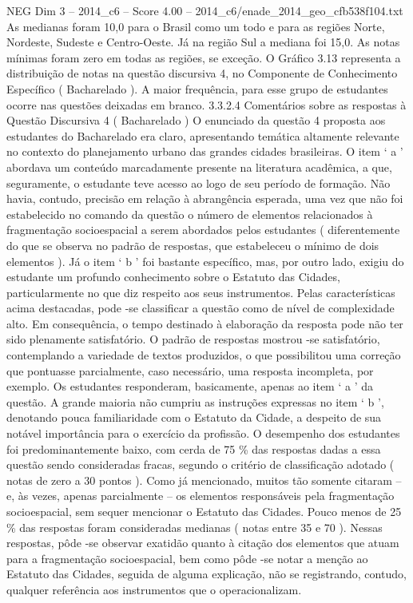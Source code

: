 \begin{textsample}{NEG Dim 3 – 2014\_c6 – Score 4.00 – 2014\_c6/enade\_2014\_geo\_cfb538f104.txt}
As medianas foram 10,0 para o Brasil como um todo e para as regiões Norte, Nordeste, Sudeste e Centro-Oeste.
Já na região Sul a mediana foi 15,0.
As notas mínimas foram zero em todas as regiões, se exceção.
O Gráfico 3.13 representa a distribuição de notas na questão discursiva 4, no Componente de Conhecimento Específico ( Bacharelado ).
A maior frequência, para esse grupo de estudantes ocorre nas questões deixadas em branco. 3.3.2.4 Comentários sobre as respostas à Questão Discursiva 4 ( Bacharelado ) O enunciado da questão 4 proposta aos estudantes do Bacharelado era claro, apresentando temática altamente relevante no contexto do planejamento urbano das grandes cidades brasileiras.
O item ‘ a ’ abordava um conteúdo marcadamente presente na literatura acadêmica, a que, seguramente, o estudante teve acesso ao logo de seu período de formação.
Não havia, contudo, precisão em relação à abrangência esperada, uma vez que não foi estabelecido no comando da questão o número de elementos relacionados à fragmentação socioespacial a serem abordados pelos estudantes ( diferentemente do que se observa no padrão de respostas, que estabeleceu o mínimo de dois elementos ).
Já o item ‘ b ’ foi bastante específico, mas, por outro lado, exigiu do estudante um profundo conhecimento sobre o Estatuto das Cidades, particularmente no que diz respeito aos seus instrumentos.
Pelas características acima destacadas, pode -se classificar a questão como de nível de complexidade alto.
Em consequência, o tempo destinado à elaboração da resposta pode não ter sido plenamente satisfatório.
O padrão de respostas mostrou -se satisfatório, contemplando a variedade de textos produzidos, o que possibilitou uma correção que pontuasse parcialmente, caso necessário, uma resposta incompleta, por exemplo.
Os estudantes responderam, basicamente, apenas ao item ‘ a ’ da questão.
A grande maioria não cumpriu as instruções expressas no item ‘ b ’, denotando pouca familiaridade com o Estatuto da Cidade, a despeito de sua notável importância para o exercício da profissão.
O desempenho dos estudantes foi predominantemente baixo, com cerda de 75 \% das respostas dadas a essa questão sendo consideradas fracas, segundo o critério de classificação adotado ( notas de zero a 30 pontos ).
Como já mencionado, muitos tão somente citaram – e, às vezes, apenas parcialmente – os elementos responsáveis pela fragmentação socioespacial, sem sequer mencionar o Estatuto das Cidades.
Pouco menos de 25 \% das respostas foram consideradas medianas ( notas entre 35 e 70 ).
Nessas respostas, pôde -se observar exatidão quanto à citação dos elementos que atuam para a fragmentação socioespacial, bem como pôde -se notar a menção ao Estatuto das Cidades, seguida de alguma explicação, não se registrando, contudo, qualquer referência aos instrumentos que o operacionalizam.

\end{textsample}
